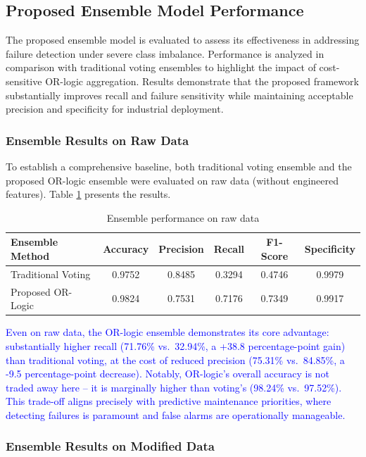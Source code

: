 \subsection{Proposed Ensemble Model Performance}
The proposed ensemble model is evaluated to assess its effectiveness in addressing failure detection under severe class imbalance. Performance is analyzed in comparison with traditional voting ensembles to highlight the impact of cost-sensitive OR-logic aggregation. Results demonstrate that the proposed framework substantially improves recall and failure sensitivity while maintaining acceptable precision and specificity for industrial deployment.


\subsubsection{Ensemble Results on Raw Data}

To establish a comprehensive baseline, both traditional voting ensemble and the proposed OR-logic ensemble were evaluated on raw data (without engineered features). Table \ref{tab:ensemble_raw} presents the results.

\begin{table}[htbp]
\centering
\caption{Ensemble performance on raw data}
\label{tab:ensemble_raw}
\begin{tabular}{lccccc}
\hline
\textbf{Ensemble Method} & \textbf{Accuracy} & \textbf{Precision} & \textbf{Recall} & \textbf{F1-Score} & \textbf{Specificity} \\
\hline
Traditional Voting & 0.9752 & 0.8485 & 0.3294 & 0.4746 & 0.9979 \\
Proposed OR-Logic & 0.9824 & 0.7531 & 0.7176 & 0.7349 & 0.9917 \\
\hline
\end{tabular}
\end{table}

\textcolor{blue}{Even on raw data, the OR-logic ensemble demonstrates its core advantage: substantially higher recall (71.76\% vs.\ 32.94\%, a +38.8 percentage-point gain) than traditional voting, at the cost of reduced precision (75.31\% vs.\ 84.85\%, a -9.5 percentage-point decrease). Notably, OR-logic's overall accuracy is not traded away here -- it is marginally higher than voting's (98.24\% vs.\ 97.52\%). This trade-off aligns precisely with predictive maintenance priorities, where detecting failures is paramount and false alarms are operationally manageable.}

\subsubsection{Ensemble Results on Modified Data}

